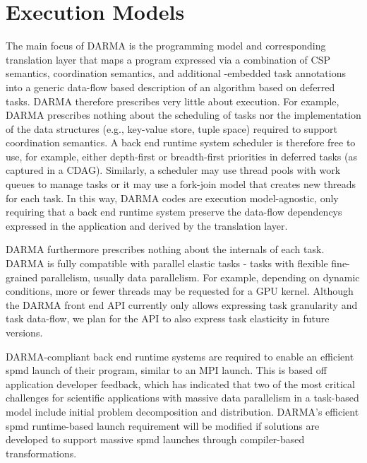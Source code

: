 

\section{Execution Models}
\label{sec:exec_model}
The main focus of \gls{DARMA} is the \gls{programming model} and corresponding
\gls{translation layer} that maps a program expressed via a combination of
\gls{CSP} semantics, \gls{coordination semantics}, and additional \CC{}-embedded task annotations into a generic data-flow based
description of an algorithm based on deferred tasks.
\gls{DARMA} therefore prescribes very little about execution.
For example, \gls{DARMA} prescribes nothing about the scheduling of tasks nor the implementation 
of the data structures (e.g., \gls{key-value store}, \gls{tuple space}) required to support \gls{coordination semantics}.
A \gls{back end} \gls{runtime system} scheduler is therefore free to use, for example,
either depth-first or breadth-first priorities in deferred tasks (as captured
in a \gls{CDAG}).
Similarly, a scheduler may use \glspl{thread pool} with work queues to manage
tasks or it may use a \gls{fork-join} model that creates new threads for each task.
In this way, \gls{DARMA} codes are \gls{execution model}-agnostic, only
requiring that a \gls{back end} \gls{runtime system} preserve the
\glspl{data-flow dependency} expressed in the application and derived by the
\gls{translation layer}.

\gls{DARMA} furthermore prescribes nothing about the internals of each task.
\gls{DARMA} is fully compatible with parallel elastic tasks - tasks with flexible fine-grained parallelism, usually data parallelism.
For example, depending on dynamic conditions, more or fewer threads may be requested for a GPU kernel.
Although the \gls{DARMA} \gls{front end} \gls{API} currently only allows expressing task granularity and task data-flow,
we plan for the \gls{API} to also express task elasticity in future versions.

\gls{DARMA}-compliant \gls{back end} \gls{runtime systems} are required to enable an efficient
\gls{spmd} launch of their program, similar to an MPI launch.
This is based off application developer feedback, which has indicated that 
two of the most critical challenges for scientific applications with massive data parallelism in a task-based model
include initial problem decomposition and distribution.
\gls{DARMA}'s efficient \gls{spmd} runtime-based launch requirement 
will be modified if solutions are developed to support massive \gls{spmd} launches
through compiler-based transformations.

